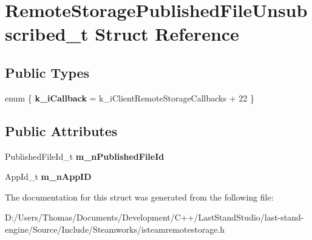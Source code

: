 \hypertarget{structRemoteStoragePublishedFileUnsubscribed__t}{}\section{Remote\+Storage\+Published\+File\+Unsubscribed\+\_\+t Struct Reference}
\label{structRemoteStoragePublishedFileUnsubscribed__t}
\subsection*{Public Types}
\begin{DoxyCompactItemize}
\item 
\hypertarget{structRemoteStoragePublishedFileUnsubscribed__t_ac2568cceee7dce5123647b27b2bf0fe2}{}enum \{ {\bfseries k\+\_\+i\+Callback} = k\+\_\+i\+Client\+Remote\+Storage\+Callbacks + 22
 \}\label{structRemoteStoragePublishedFileUnsubscribed__t_ac2568cceee7dce5123647b27b2bf0fe2}

\end{DoxyCompactItemize}
\subsection*{Public Attributes}
\begin{DoxyCompactItemize}
\item 
\hypertarget{structRemoteStoragePublishedFileUnsubscribed__t_ab55a8bf637e3fc784f642679766067f5}{}Published\+File\+Id\+\_\+t {\bfseries m\+\_\+n\+Published\+File\+Id}\label{structRemoteStoragePublishedFileUnsubscribed__t_ab55a8bf637e3fc784f642679766067f5}

\item 
\hypertarget{structRemoteStoragePublishedFileUnsubscribed__t_afb81b9afccdac8f83236554bd8d6c277}{}App\+Id\+\_\+t {\bfseries m\+\_\+n\+App\+I\+D}\label{structRemoteStoragePublishedFileUnsubscribed__t_afb81b9afccdac8f83236554bd8d6c277}

\end{DoxyCompactItemize}


The documentation for this struct was generated from the following file\+:\begin{DoxyCompactItemize}
\item 
D\+:/\+Users/\+Thomas/\+Documents/\+Development/\+C++/\+Last\+Stand\+Studio/last-\/stand-\/engine/\+Source/\+Include/\+Steamworks/isteamremotestorage.\+h\end{DoxyCompactItemize}
